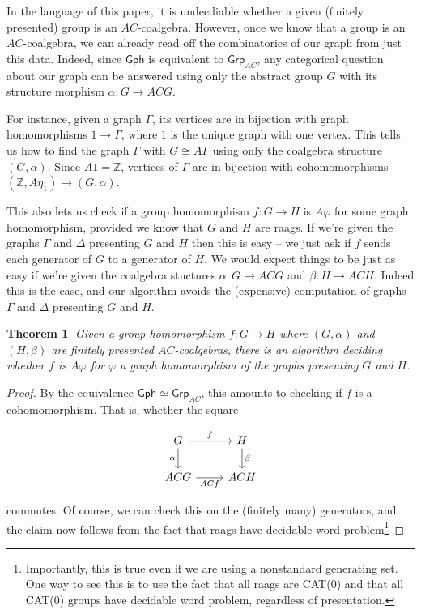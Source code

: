 \documentclass[12pt]{article}
\newtheorem{thm}{Theorem}
\theoremstyle{definition}
\theoremstyle{theorem}
\newcommand*{\catFont}[1]{\mathsf{#1}}
\newcommand{\Grp}{\catFont{Grp}}
\begin{document}
In the language of this paper, it is undecdiable whether a given
(finitely presented) group is an $AC$-coalgebra. However, once we know
that a group is an $AC$-coalgebra, we can already read off the combinatorics
of our graph from just this data. Indeed, since $\mathsf{Gph}$ is equivalent
to $\Grp_{AC}$, any categorical question about our graph can be answered 
using only the abstract group $G$ with its structure morphism $\alpha : G \to ACG$.

For instance, given a graph $\Gamma$, its vertices are in bijection with
graph homomorphisms $1 \to \Gamma$, where $1$ is the unique graph with one vertex.
This tells us how to find the graph $\Gamma$ with $G \cong A\Gamma$ using
only the coalgebra structure $(G,\alpha)$. Since $A 1 = \mathbb{Z}$,
vertices of $\Gamma$ are in bijection with cohomomorphisms 
$(\mathbb{Z}, A \eta_1) \to (G, \alpha)$. 

This also lets us check if a group homomorphism $f : G \to H$ is
$A \varphi$ for some graph homomorphism, provided we know that $G$ 
and $H$ are raags. If we're given the graphs $\Gamma$ and $\Delta$
presenting $G$ and $H$ then this is easy -- we just ask if $f$ sends 
each generator of $G$ to a generator of $H$. We would expect things to
be just as easy if we're given the coalgebra stuctures 
$\alpha : G \to ACG$ and $\beta : H \to ACH$. Indeed this is the case,
and our algorithm avoids the (expensive) computation of graphs $\Gamma$
and $\Delta$ presenting $G$ and $H$.

\begin{thm}
    Given a group homomorphism $f : G \to H$ where $(G,\alpha)$ and $(H,\beta)$
    are finitely presented $AC$-coalgebras, there is an algorithm deciding 
    whether $f$ is $A \varphi$ for $\varphi$ a graph homomorphism of the graphs 
    presenting $G$ and $H$.
\end{thm}

\begin{proof}
    By the equivalence $\mathsf{Gph} \simeq \Grp_{AC}$, this amounts to 
    checking if $f$ is a cohomomorphism. That is, whether the square

    \[
        \begin{tikzcd}
            G & H \\
            ACG & ACH
            \arrow["f", from=1-1, to=1-2]
            \arrow["\alpha"', from=1-1, to=2-1]
            \arrow["ACf"', from=2-1, to=2-2]
            \arrow["\beta", from=1-2, to=2-2]
        \end{tikzcd}
    \]

    commutes. Of course, we can check this on the (finitely many) generators, 
    and the claim now follows from the fact that raags have decidable 
    word problem\footnote{Importantly, this is true even if we are using a 
    nonstandard generating set. One way to see this is to use the fact
    that all raags are CAT(0) and that all CAT(0) 
    groups have decidable word problem, regardless of presentation.}
\end{proof}
\end{document}
